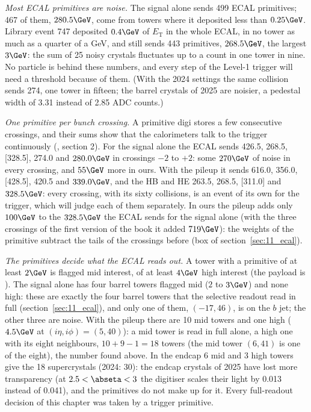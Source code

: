 \emph{Most ECAL primitives are noise.} The signal alone sends 499 ECAL primitives; 467 of them, $280.5\GeV$, come
from towers where it deposited less than $0.25\GeV$. Library event 747 deposited $0.4\GeV$ of $E_{\mathrm T}$ in
the whole ECAL, in no tower as much as a quarter of a GeV, and still sends 443 primitives, $268.5\GeV$, the
largest $3\GeV$: the sum of 25 noisy crystals fluctuates up to a count in one tower in nine. No particle is behind
these numbers, and every step of the Level-1 trigger will need a threshold because of them. (With the 2024 settings
the same collision sends 274, one tower in fifteen; the barrel crystals of 2025 are noisier, a pedestal width of 3.31
instead of 2.85 ADC counts.)

\emph{One primitive per bunch crossing.} A primitive digi stores a few consecutive crossings, and their sums show
that the calorimeters talk to the trigger continuously (, section 2). For the signal
alone the ECAL sends 426.5, 268.5, [328.5], 274.0 and $280.0\GeV$ in crossings $-2$ to $+2$: some $270\GeV$ of
noise in every crossing, and $55\GeV$ more in ours. With the pileup it sends 616.0, 356.0, [428.5], 420.5 and
$339.0\GeV$, and the HB and HE 263.5, 268.5, [311.0] and $328.5\GeV$: every crossing, with its sixty collisions, is an
event of its own for the trigger, which will judge each of them separately. In ours the pileup adds only $100\GeV$ to
the $328.5\GeV$ the ECAL sends for the signal alone (with the three crossings of the first version of the book it added $719\GeV$): the
weights of the primitive subtract the tails of the crossings before (box of section~\ref{sec:11_ecal}).

\emph{The primitives decide what the ECAL reads out.} A tower with a primitive of at least $2\GeV$ is flagged mid
interest, of at least $4\GeV$ high interest (the payload is
). The signal alone has four barrel towers flagged mid
($2$ to $3\GeV$) and none high: these are exactly the four barrel towers that the selective readout read in
full (section~\ref{sec:11_ecal}), and only one of them, $(-17,46)$, is on the $b$ jet; the other three are noise. With
the pileup there are 10 mid towers and one high ($4.5\GeV$ at $(i\eta,i\phi)=(5,40)$): a mid tower is read in full
alone, a high one with its eight neighbours, $10+9-1=18$ towers (the mid tower $(6,41)$ is one of the eight), the
number found above. In the endcap 6 mid and 3 high towers give the 18 supercrystals (2024: 30): the endcap crystals of
2025 have lost more transparency (at $2.5<\abseta<3$ the digitiser scales their light by 0.013 instead of 0.041), and
the primitives do not make up for it. Every full-readout decision of this chapter was taken by a trigger primitive.

